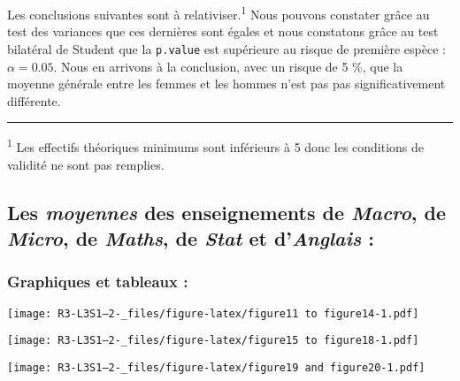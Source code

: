 \documentclass[
  11pt,
  french,
]{article}
\begin{document}
Les conclusions suivantes sont à relativiser.\textsuperscript{1} Nous
pouvons constater grâce au test des variances que ces dernières sont
égales et nous constatons grâce au test bilatéral de Student que la
\texttt{p.value} est supérieure au risque de première espèce :
\(\alpha = 0.05\). Nous en arrivons à la conclusion, avec un risque de 5
\%, que la moyenne générale entre les femmes et les hommes n'est pas pas
significativement différente.

\begin{center}\rule{0.5\linewidth}{0.5pt}\end{center}

\textsuperscript{1} Les effectifs théoriques minimums sont inférieurs à
5 donc les conditions de validité ne sont pas remplies.

\hypertarget{les-moyennes-des-enseignements-de-macro-de-micro-de-maths-de-stat-et-danglais}{%
\subsection{\texorpdfstring{Les \emph{moyennes} des enseignements de
\emph{Macro}, de \emph{Micro}, de \emph{Maths}, de \emph{Stat} et
d'\emph{Anglais}
:}{Les moyennes des enseignements de Macro, de Micro, de Maths, de Stat et d'Anglais :}}\label{les-moyennes-des-enseignements-de-macro-de-micro-de-maths-de-stat-et-danglais}}

\hypertarget{graphiques-et-tableaux-2}{%
\subsubsection{Graphiques et tableaux
:}\label{graphiques-et-tableaux-2}}

\texttt{[image: R3-L3S1--2-\_files/figure-latex/figure11 to figure14-1.pdf]}

\texttt{[image: R3-L3S1--2-\_files/figure-latex/figure15 to figure18-1.pdf]}

\texttt{[image: R3-L3S1--2-\_files/figure-latex/figure19 and figure20-1.pdf]}
\end{document}

